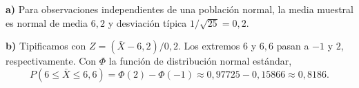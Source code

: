 \textbf{a)} Para observaciones independientes de una población normal, la media muestral es normal de media $6{,}2$ y desviación típica $1/\sqrt{25}=0{,}2$.

\textbf{b)} Tipificamos con $Z=(\bar X-6{,}2)/0{,}2$. Los extremos $6$ y $6{,}6$ pasan a $-1$ y $2$, respectivamente. Con $\Phi$ la función de distribución normal estándar,
\[
P(6\le\bar X\le6{,}6)
=\Phi(2)-\Phi(-1)\approx0{,}97725-0{,}15866
\approx\boxed{0{,}8186}.
\]
